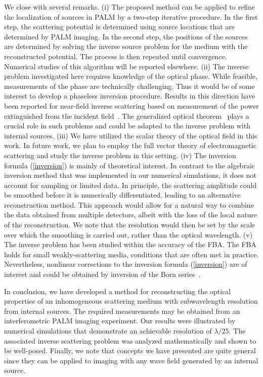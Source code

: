 \documentclass[prl,twocolumn]{revtex4-1}
\begin{document}
We close with several remarks. (i) The proposed method can be applied to refine the localization of sources in PALM by a two-step iterative procedure. In the first step, the scattering potential is determined using source locations that are determined by PALM imaging. In the second step, the positions of the sources are determined by solving the inverse source problem for the medium with the reconstructed potential. The process is then repeated until convergence. Numerical studies of this algorithm will be reported elsewhere. (ii) The inverse problem investigated here requires knowledge of the optical phase. While feasible, measurements of the phase are technically challenging. Thus it would be of some interest to develop a phaseless inversion procedure. Results in this direction have been reported for near-field inverse scattering based on measurement of the power extinguished from the incident field~\cite{carney_2001,govyadinov_2009}. The generalized optical theorem~\cite{carney_2004again} plays a crucial role in such problems and could be adapted to the inverse problem with internal sources. (iii) We have utilized the scalar theory of the optical field in this work. In future work, we plan to employ the full vector theory of electromagnetic scattering and study the inverse problem in this setting. (iv) The inversion formula (\ref{inversion}) is mainly of theoretical interest. In contrast to the algebraic inversion method that was implemented in our numerical simulations, it does not account for sampling or limited data. In principle, the scattering amplitude could be smoothed before it is numerically differentiated, leading to an alternative reconstruction method. This approach would allow for a natural way to combine the data obtained from multiple detectors, albeit with the loss of the local nature of the reconstruction. We note that the resolution would then be set by the scale over which the smoothing is carried out, rather than the optical wavelength. (v) The inverse problem has been studied within the accuracy of the FBA. The FBA holds for small weakly-scattering media, conditions that are often met in practice. Nevertheless, nonlinear corrections to the inversion formula (\ref{inversion}) are of interest and could be obtained by inversion of the Born series~\cite{inv_born}.

In conclusion, we have developed a method for reconstructing the optical properties of an inhomogeneous scattering medium with subwavelength resolution from internal sources. The required measurements may be obtained from an interferometric PALM imaging experiment. Our results were illustrated by numerical simulations that demonstrate an achievable resolution of $\lambda/25$. The associated inverse scattering problem was analyzed mathematically and shown to be well-posed. Finally, we note that concepts we have presented are quite general since they can be applied to imaging with any wave field generated by an internal source. 
\end{document}
